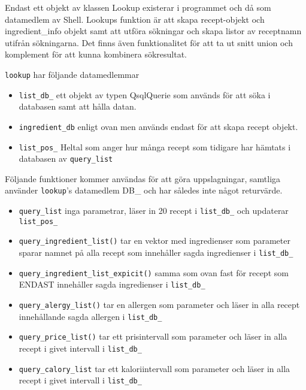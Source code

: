 Endast ett objekt av klassen Lookup existerar i programmet och då som
datamedlem av Shell. Lookups funktion är att skapa recept-objekt och
ingredient\_info objekt samt att utföra sökningar och skapa listor av
receptnamn utifrån sökningarna. Det finns även funktionalitet för att
ta ut snitt union och komplement för att kunna kombinera sökresultat.

\verb+lookup+ har följande datamedlemmar
\begin{itemize}
\item   \verb+list_db_+ ett objekt av typen QsqlQuerie som används
        för att söka i databasen samt att hålla datan.
\item   \verb+ingredient_db+ enligt ovan men används endast för
        att skapa recept objekt.
\item   \verb+list_pos_+ Heltal som anger hur många recept som tidigare
        har hämtats i databasen av \verb+query_list+
\end{itemize}

Följande funktioner kommer användas för att göra uppslagningar,
samtliga använder \verb+lookup+'s datamedlem DB\_ och har således 
inte något returvärde. 

\begin{itemize}
\item   \verb+query_list+ inga parametrar, läser in 20 recept i \verb+list_db_+ 
        och updaterar \verb+list_pos_+

\item   \verb+query_ingredient_list()+ tar en vektor med ingredienser som
        parameter sparar namnet på alla recept som innehåller sagda ingredienser
        i \verb+list_db_+  

\item   \verb+query_ingredient_list_expicit()+ samma som ovan fast för recept som
        ENDAST innehåller sagda ingredienser i \verb+list_db_+  
   
\item   \verb+query_alergy_list()+ tar en allergen som parameter och läser in alla 
        recept innehållande sagda allergen i \verb+list_db_+  

\item   \verb+query_price_list()+ tar ett prisintervall som parameter och läser in
        alla recept i givet intervall i \verb+list_db_+  

\item   \verb+query_calory_list+ tar ett kaloriintervall som parameter och läser in
        alla recept i givet intervall i \verb+list_db_+  
\end{itemize}
 

